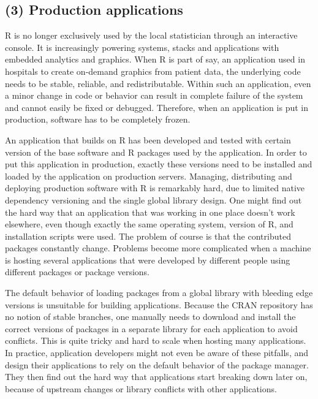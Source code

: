 \subsection{(3) Production applications}

R is no longer exclusively used by the local statistician through an
interactive console. It is increasingly powering systems, stacks and
applications with embedded analytics and graphics. When R is part of say, an
application used in hospitals to create on-demand graphics from patient data,
the underlying code needs to be stable, reliable, and redistributable. Within
such an application, even a minor change in code or behavior can result in
complete failure of the system and cannot easily be fixed or debugged.
Therefore, when an application is put in production, software has to be
completely frozen.

An application that builds on R has been developed and tested with certain
version of the base software and R packages used by the application. In order
to put this application in production, exactly these versions need to be
installed and loaded by the application on production servers. Managing,
distributing and deploying production software with R is remarkably hard, due
to limited native dependency versioning and the single global library design.
One might find out the hard way that an application that was working in one
place doesn't work elsewhere, even though exactly the same operating system,
version of R, and installation scripts were used. The problem of course is that
the contributed packages constantly change. Problems become more complicated
when a machine is hosting several applications that were developed by different
people using different packages or package versions.

The default behavior of loading packages from a global library with bleeding
edge versions is unsuitable for building applications. Because the CRAN
repository has no notion of stable branches, one manually needs to download and
install the correct versions of packages in a separate library for each
application to avoid conflicts. This is quite tricky and hard to scale when
hosting many applications. In practice, application developers might not even be
aware of these pitfalls, and design their applications to rely on the default
behavior of the package manager. They then find out the hard way that
applications start breaking down later on, because of upstream changes or
library conflicts with other applications.

